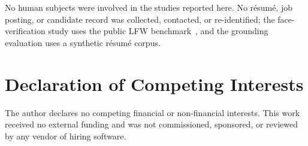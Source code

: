 No human subjects were involved in the studies reported here. No résumé, job
posting, or candidate record was collected, contacted, or re-identified; the
face-verification study uses the public LFW benchmark~\cite{huang2007lfw}, and
the grounding evaluation uses a synthetic résumé corpus.

\section*{Declaration of Competing Interests}

The author declares no competing financial or non-financial interests. This work
received no external funding and was not commissioned, sponsored, or reviewed by
any vendor of hiring software.





